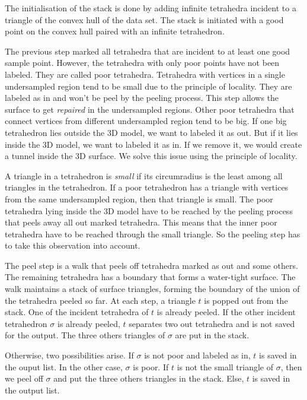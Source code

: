 \documentclass[12pt]{article}
\begin{document}
The initialisation of the stack is done by adding infinite tetrahedra incident to a triangle of the convex hull of the data set. The stack is initiated with a good point on the convex hull paired with an infinite tetrahedron.

The previous step marked all tetrahedra that are incident to at least one good sample point. However, the tetrahedra with only poor points have not been labeled. They are called poor tetrahedra. Tetrahedra with vertices in a single undersampled region tend to be small due to the principle of locality. They are labeled as in and won't be peel by the peeling process. This step allows the surface to get \emph{repaired} in the undersampled regions. Other poor tetrahedra that connect vertices from different undersampled region tend to be big. If one big tetrahedron lies outside the 3D model, we want to labeled it as out. But if it lies inside the 3D model, we want to labeled it as in. If we remove it, we would create a tunnel inside the 3D surface. We solve this issue using the principle of locality.

A triangle in a tetrahedron is \emph{small} if its circumradius is the least among all triangles in the tetrahedron. If a poor tetrahedron has a triangle with vertices from the same undersampled region, then that triangle is small. The poor tetrahedra lying inside the 3D model have to be reached by the peeling process that peels away all out marked tetrahedra. This means that the inner poor tetrahedra have to be reached through the small triangle. So the peeling step has to take this observation into account.

The peel step is a walk that peels off tetrahedra marked as out and some others. The remaining tetrahedra has a boundary that forms a water-tight surface. The walk maintains a stack of surface triangles, forming the boundary of the union of the tetrahedra peeled so far. At each step, a triangle $t$ is popped out from the stack. One of the incident tetrahedra of $t$ is already peeled. If the other incident tetrahedron $\sigma$ is already peeled, $t$ separates two out tetrahedra and is not saved for the output. The three others triangles of $\sigma$ are put in the stack.

Otherwise, two possibilities arise. If $\sigma$ is not poor and labeled as in, $t$ is saved in the ouput list. In the other case, $\sigma$ is poor. If $t$ is not the small triangle of $\sigma$, then we peel off $\sigma$ and put the three others triangles in the stack. Else, $t$ is saved in the output list.
\end{document}
